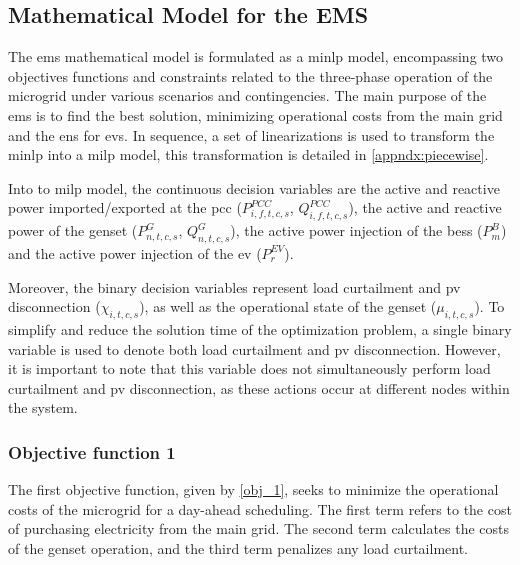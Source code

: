 \documentclass[preprint, 10pt, 5p]{elsarticle}
\begin{document}
\subsection{Mathematical Model for the EMS}

The \gls{ems} mathematical model is formulated as a \gls{minlp} 
model, encompassing two objectives functions and constraints related to the 
three-phase operation of the microgrid under various scenarios and 
contingencies. The main purpose of the \gls{ems} is to find the best solution, minimizing 
operational costs from the main grid and the \gls{ens} for \glspl{ev}. 
In sequence, a set of linearizations is used to transform the 
\gls{minlp} into a \gls{milp} model, this transformation is detailed in
\ref{appndx:piecewise}.

Into to \gls{milp} model, the continuous decision variables are the active and reactive power 
imported/exported at the \gls{pcc} ($P_{i,f,t,c,s}^{PCC}$, 
$Q_{i,f,t,c,s}^{PCC}$), the active and reactive 
power of the genset ($P_{n,t,c,s}^{G}$, $Q_{n,t,c,s}^{G}$), the active power 
injection of the \gls{bess} ($P_{m}^{B}$) and the active power injection of 
the \gls{ev} ($P_{r}^{EV}$).

Moreover, the binary decision variables represent load curtailment and \gls{pv}
disconnection ($\chi_{i,t,c,s}$), as well as the operational state of 
the genset ($\mu_{i,t,c,s}$). To simplify and reduce the solution time of 
the optimization problem, a single binary variable is used to denote both 
load curtailment and \gls{pv} disconnection. However, it is important to 
note that this variable does not simultaneously perform load curtailment 
and \gls{pv} disconnection, as these actions occur at different nodes within 
the system.

\subsubsection{Objective function 1}

The first objective function, given by \eqref{obj_1}, seeks to minimize the 
operational costs of the microgrid for a day-ahead scheduling. 
The first term refers to the cost of purchasing electricity 
from the main grid. The second term calculates the costs of the \gls{genset} 
operation, and the third term penalizes any load curtailment. 
\end{document}
